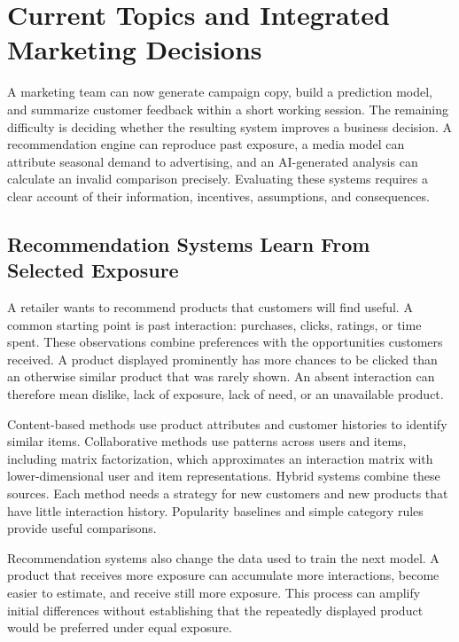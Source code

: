 \hypertarget{M08-m8.-current-topics-and-integrated-marketing-decisions}{%
\chapter{Current Topics and Integrated Marketing
Decisions}\label{M08-m8.-current-topics-and-integrated-marketing-decisions}}

\noindent A marketing team can now generate campaign copy, build a prediction
model, and summarize customer feedback within a short working session.
The remaining difficulty is deciding whether the resulting system
improves a business decision. A recommendation engine can reproduce past
exposure, a media model can attribute seasonal demand to advertising,
and an AI-generated analysis can calculate an invalid comparison
precisely. Evaluating these systems requires a clear account of their
information, incentives, assumptions, and consequences.

\hypertarget{M08-recommendation-systems-learn-from-selected-exposure}{%
\section{Recommendation Systems Learn From Selected
Exposure}\label{M08-recommendation-systems-learn-from-selected-exposure}}

\noindent A retailer wants to recommend products that customers will find useful.
A common starting point is past interaction: purchases, clicks, ratings,
or time spent. These observations combine preferences with the
opportunities customers received. A product displayed prominently has
more chances to be clicked than an otherwise similar product that was
rarely shown. An absent interaction can therefore mean dislike, lack of
exposure, lack of need, or an unavailable product.

Content-based methods use product attributes and customer histories to
identify similar items. Collaborative methods use patterns across users
and items, including matrix factorization, which approximates an
interaction matrix with lower-dimensional user and item representations.
Hybrid systems combine these sources. Each method needs a strategy for
new customers and new products that have little interaction history.
Popularity baselines and simple category rules provide useful
comparisons.

Recommendation systems also change the data used to train the next
model. A product that receives more exposure can accumulate more
interactions, become easier to estimate, and receive still more
exposure. This process can amplify initial differences without
establishing that the repeatedly displayed product would be preferred
under equal exposure.

